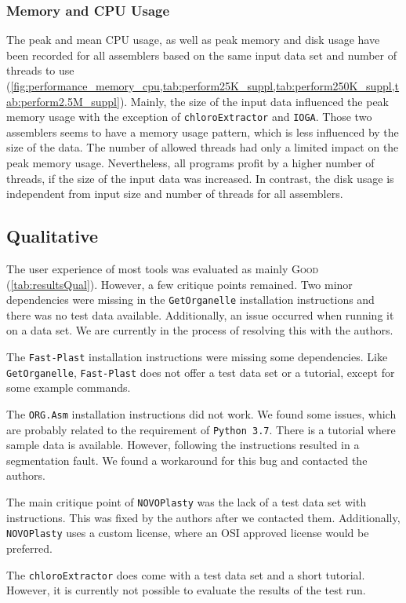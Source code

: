 \documentclass{bmcart}
\newcommand{\formatprogramnames}[1]{\texttt{#1}}
\newcommand{\ce}{\formatprogramnames{chloroExtractor}}
\newcommand{\oa}{\formatprogramnames{ORG.Asm}}
\newcommand{\fp}{\formatprogramnames{Fast-Plast}}
\newcommand{\ioga}{\formatprogramnames{IOGA}}
\newcommand{\np}{\formatprogramnames{NOVOPlasty}}
\newcommand{\go}{\formatprogramnames{GetOrganelle}}
\newcommand{\good}{\textsc{Good}}
\begin{document}
\subsubsection*{Memory and CPU Usage }
The peak and mean CPU usage, as well as peak memory and disk usage have been recorded for all assemblers based on the same input data set and number of threads to use (\cref{fig:performance_memory_cpu,tab:perform25K_suppl,tab:perform250K_suppl,tab:perform2.5M_suppl}).
Mainly, the size of the input data influenced the peak memory usage with the exception of \ce{} and \ioga{}.
Those two assemblers seems to have a memory usage pattern, which is less influenced by the size of the data.
The number of allowed threads had only a limited impact on the peak memory usage.
Nevertheless, all programs profit by a higher number of threads, if the size of the input data was increased.
In contrast, the disk usage is independent from input size and number of threads for all assemblers.

\subsection*{Qualitative}
The user experience of most tools was evaluated as mainly \good{} (\cref{tab:resultsQual}). However, a few critique points remained.
Two minor dependencies were missing in the \go{} installation instructions and there was no test data available.
Additionally, an issue occurred when running it on a  data set.
We are currently in the process of resolving this with the authors.

The \fp{} installation instructions were missing some dependencies.
Like \go{}, \fp{} does not offer a test data set or a tutorial, except for some example commands. 

The \oa{} installation instructions did not work.
We found some issues, which are probably related to the requirement of \texttt{Python~3.7}.
There is a tutorial where sample data is available.
However, following the instructions resulted in a segmentation fault.
We found a workaround for this bug and contacted the authors.

The main critique point of \np{} was the lack of a test data set with instructions.
This was fixed by the authors after we contacted them.
Additionally, \np{} uses a custom license, where an OSI approved license would be preferred.

The \ce{} does come with a test data set and a short tutorial.
However, it is currently not possible to evaluate the results of the test run.
\end{document}
